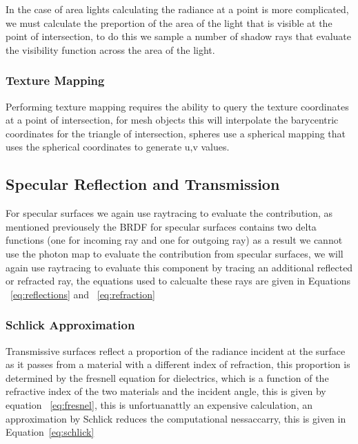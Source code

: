 In the case of area lights calculating the radiance at a point is more complicated, we must calculate the preportion of the
area of the light that is visible at the point of intersection, to do this we sample a number of shadow rays that evaluate the
visibility function across the area of the light.


\subsubsection{Texture Mapping}
Performing texture mapping requires the ability to query the texture coordinates at a point of intersection, for mesh objects this
will interpolate the barycentric coordinates for the triangle of intersection, spheres use a spherical mapping that uses the
spherical coordinates to generate u,v values.

\subsection{Specular Reflection and Transmission}
For specular surfaces we again use raytracing to evaluate the contribution, as mentioned previousely the BRDF for specular surfaces
contains two delta functions (one for incoming ray and one for outgoing ray) as a result we cannot use the photon map to evaluate
the contribution from specular surfaces, we will again use raytracing to evaluate this component by tracing an additional reflected
or refracted ray, the equations used to calcualte these rays are given in Equations ~\ref{eq:reflections} and ~\ref{eq:refraction}


\subsubsection{Schlick Approximation}
Transmissive surfaces reflect a proportion of the radiance incident at the surface as it passes from a material with a different
index of refraction, this proportion is determined by the fresnell equation for dielectrics, which is a function of the refractive
index of the two materials and the incident angle, this is given by equation ~\ref{eq:fresnel}, this is unfortuanattly an expensive
calculation, an approximation by Schlick  reduces the computational nessaccarry, this is given in Equation~\ref{eq:schlick}



